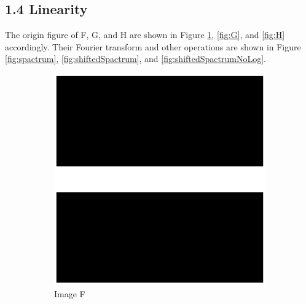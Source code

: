 \documentclass[11pt,a4paper]{article}
\begin{document}
\subsection*{1.4 Linearity}
\par The origin figure of F, G, and H are shown in Figure \ref{fig:F}, \ref{fig:G}, and \ref{fig:H} accordingly. Their Fourier transform and other operations are shown in Figure \ref{fig:spactrum}, \ref{fig:shiftedSpactrum}, and \ref{fig:shiftedSpactrumNoLog}.
\begin{figure}[!ht]
	\footnotesize
	\centering 
	\begin{subfigure}[t]{.32\linewidth} %
	\includegraphics[width=\columnwidth]{Linearity_F.eps}
	\caption{Image F}
	\label{fig:F}
	\end{subfigure}
	\begin{subfigure}[t]{.32\linewidth} %

\end{subfigure}
\end{figure}
\end{document}
